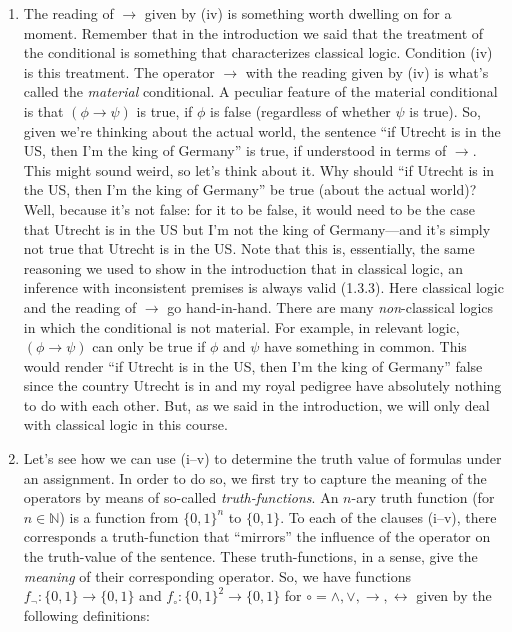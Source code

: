 \begin{enumerate}[\thesection.1]
		\item The reading of $\to$ given by (iv) is something worth dwelling on for a moment. Remember that in the introduction we said that the treatment of the conditional is something that characterizes classical logic. Condition (iv) is this treatment. The operator $\to$ with the reading given by (iv) is what's called the \emph{material} conditional. A peculiar feature of the material conditional is that $(\phi\to\psi)$ is true, if $\phi$ is false (regardless of whether $\psi$ is true). So, given we're thinking about the actual world, the sentence ``if Utrecht is in the US, then I'm the king of Germany'' is true, if understood in terms of $\to$. This might sound weird, so let's think about it. Why should ``if Utrecht is in the US, then I'm the king of Germany'' be true (about the actual world)? Well, because it's not false: for it to be false, it would need to be the case that Utrecht is in the US but I'm not the king of Germany---and it's simply not true that Utrecht is in the US. Note that this is, essentially, the same reasoning we used to show in the introduction that in classical logic, an inference with inconsistent premises is always valid (1.3.3). Here classical logic and the reading of $\to$ go hand-in-hand. There are many \emph{non}-classical logics in which the conditional is not material. For example, in relevant logic, $(\phi\to\psi)$ can only be true if $\phi$ and $\psi$ have something in common. This would render ``if Utrecht is in the US, then I'm the king of Germany'' false since the country Utrecht is in and my royal pedigree have absolutely nothing to do with each other. But, as we said in the introduction, we will only deal with classical logic in this course.
		
		\item Let's see how we can use (i--v) to determine the truth value of formulas under an assignment. In order to do so, we first try to capture the meaning of the operators by means of so-called \emph{truth-functions}. An $n$-ary truth function (for $n\in\mathbb{N}$) is a function from $\{0,1\}^n$ to $\{0,1\}$. To each of the clauses (i--v), there corresponds a truth-function that ``mirrors'' the influence of the operator on the truth-value of the sentence. These truth-functions, in a sense, give the \emph{meaning} of their corresponding operator. So, we have functions $f_\neg:\{0,1\}\to\{0,1\}$ and $f_\circ:\{0,1\}^2\to\{0,1\}$ for $\circ=\land,\lor,\to,\leftrightarrow$ given by the following definitions:
		\begin{enumerate}[(i)]
		

\end{enumerate}
\end{enumerate}
